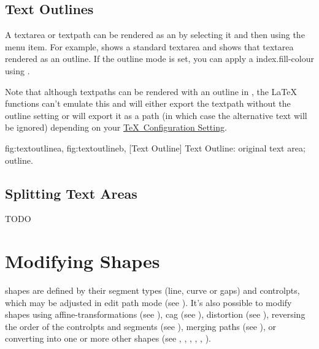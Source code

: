 
\section{Text Outlines}\label{sec:textoutline}


A \gls{textarea} or \gls{textpath} can be rendered as an
 by
selecting it and then using the 
menu item. For example,  shows a
standard \gls*{textarea} and  shows
that \gls*{textarea} rendered as an outline. If the outline mode is
set, you can apply a \gls{index.fill-colour} using
.

\begin{warning}
Note that although \glspl*{textpath} can be rendered with an outline in \FlowframTk,
the \LaTeX\  functions can't emulate
this and will either export the \gls*{textpath} without the outline
setting or will export it as a path (in which case the alternative
text will be ignored) depending on your
\hyperref[sec:texconfig]{\TeX\ Configuration Setting}.
\end{warning}

{
 {fig:textoutlinea}{}{},
 {fig:textoutlineb}{}{},
}
[Text Outline]
{Text Outline:  original text area;
   outline.}


\section{Splitting Text Areas}\label{sec:splittext}


TODO

\chapter{Modifying Shapes}\label{sec:modshape}

\Glspl{shape} are defined by their segment types (line, \gls{curve}
or \glspl{gap}) and \glspl{controlpt}, which may be adjusted in edit
path mode (see ). It's also possible to
modify \glspl{shape} using \glspl{affine-transformation} (see
), \gls{cag} (see ),
distortion (see ), reversing the order of
the \glspl{controlpt} and segments (see ), merging paths (see
), or converting into one or more other
\glspl{shape} (see ,
, ,
, ,
). 

